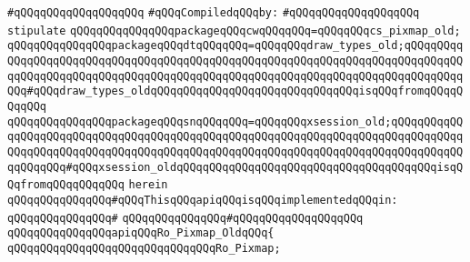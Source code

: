 \verb|#qQQqqQQqqQQqqQQqqQQq|\newline
\newline
\verb|#qQQqCompiledqQQqby:|\newline
\verb|#qQQqqQQqqQQqqQQqqQQq|\newline
\newline
\newline
\newline
\verb|stipulate|\newline
\verb|qQQqqQQqqQQqqQQqpackageqQQqcwqQQqqQQq=qQQqqQQqcs_pixmap_old;|\newline
\verb|qQQqqQQqqQQqqQQqpackageqQQqdtqQQqqQQq=qQQqqQQqdraw_types_old;qQQqqQQqqQQqqQQqqQQqqQQqqQQqqQQqqQQqqQQqqQQqqQQqqQQqqQQqqQQqqQQqqQQqqQQqqQQqqQQqqQQqqQQqqQQqqQQqqQQqqQQqqQQqqQQqqQQqqQQqqQQqqQQqqQQqqQQqqQQqqQQqqQQqqQQq#qQQqdraw_types_oldqQQqqQQqqQQqqQQqqQQqqQQqqQQqqQQqisqQQqfromqQQqqQQqqQQq|\newline
\verb|qQQqqQQqqQQqqQQqpackageqQQqsnqQQqqQQq=qQQqqQQqxsession_old;qQQqqQQqqQQqqQQqqQQqqQQqqQQqqQQqqQQqqQQqqQQqqQQqqQQqqQQqqQQqqQQqqQQqqQQqqQQqqQQqqQQqqQQqqQQqqQQqqQQqqQQqqQQqqQQqqQQqqQQqqQQqqQQqqQQqqQQqqQQqqQQqqQQqqQQqqQQqqQQq#qQQqxsession_oldqQQqqQQqqQQqqQQqqQQqqQQqqQQqqQQqqQQqqQQqisqQQqfromqQQqqQQqqQQq|\newline
\verb|herein|\newline
\newline
\verb|qQQqqQQqqQQqqQQq#qQQqThisqQQqapiqQQqisqQQqimplementedqQQqin:|\newline
\verb|qQQqqQQqqQQqqQQq#|\newline
\verb|qQQqqQQqqQQqqQQq#qQQqqQQqqQQqqQQqqQQq|\newline
\newline
\verb|qQQqqQQqqQQqqQQqapiqQQqRo_Pixmap_OldqQQq{|\newline
\newline
\verb|qQQqqQQqqQQqqQQqqQQqqQQqqQQqqQQqRo_Pixmap;|\newline
\newline
